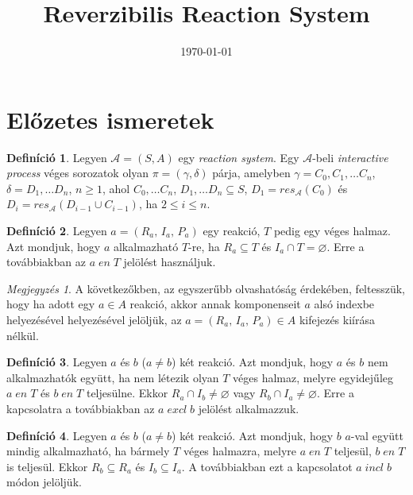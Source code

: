 \documentclass[12pt]{article}
\title{Reverzibilis Reaction System}
\date{\today}
\theoremstyle{definition}
\newtheorem*{definition*}{Definíció}
\theoremstyle{remark}
\newtheorem*{remark*}{Megjegyzés}
\theoremstyle{plain}
\let\emptyset\varnothing
\newcommand{\en}{\; \textit{en} \;}
\newcommand{\excl}{\; \textit{excl} \;}
\newcommand{\incl}{\; \textit{incl} \;}
\newcommand{\reaction}[3]{
    (#1, \, #2, \, #3)
}
\begin{document}
    \maketitle

    \section*{Előzetes ismeretek}

    \begin{definition*}
        Legyen $\mathscr{A} = (S, A)$ egy \textit{reaction system}. Egy $\mathscr{A}$-beli \textit{interactive process} véges sorozatok olyan $\pi = (\gamma, \delta)$ párja, amelyben $\gamma = C_{0}, C_{1}, \ldots C_{n}$, $\delta = D_{1}, \ldots D_{n}$, $n \geq 1$, ahol $C_{0}, \ldots C_{n}$, $D_{1}, \ldots D_{n} \subseteq S$, $D_{1} = \textit{res}_{\mathscr{A}}(C_{0})$ és $D_{i} = \textit{res}_{\mathscr{A}}(D_{i - 1} \cup C_{i - 1})$, ha $2 \leq i \leq n$.
    \end{definition*}

    \begin{definition*}
        Legyen $a = \reaction{R_{a}}{I_{a}}{P_{a}}$ egy reakció, $T$ pedig egy véges halmaz. Azt mondjuk, hogy $a$ alkalmazható $T$-re, ha $R_{a} \subseteq T$ és $I_{a} \cap T = \emptyset$. Erre a továbbiakban az $a \en T$ jelölést használjuk.
    \end{definition*}
    
    \begin{remark*}
        A következőkben, az egyszerűbb olvashatóság érdekében, feltesszük, hogy ha adott egy $a \in A$ reakció, akkor annak komponenseit $a$ alsó indexbe helyezésével helyezésével jelöljük, az $a = \reaction{R_{a}}{I_{a}}{P_{a}} \in A$ kifejezés kiírása nélkül.
    \end{remark*}

    \begin{definition*}
        Legyen $a$ és $b$ ($a \neq b$) két reakció. Azt mondjuk, hogy $a$ és $b$ nem alkalmazhatók együtt, ha nem létezik olyan $T$ véges halmaz, melyre egyidejűleg $a \en T$ és $b \en T$ teljesülne. Ekkor $R_{a} \cap I_{b} \neq \emptyset$ vagy $R_{b} \cap I_{a} \neq \emptyset$. Erre a kapcsolatra a továbbiakban az $a \excl b$ jelölést alkalmazzuk.
    \end{definition*}

    \begin{definition*}
        Legyen $a$ és $b$ ($a \neq b$) két reakció. Azt mondjuk, hogy $b$ $a$-val együtt mindig alkalmazható, ha bármely $T$ véges halmazra, melyre $a \en T$ teljesül, $b \en T$ is teljesül. Ekkor $R_{b} \subseteq R_{a}$ és $I_{b} \subseteq I_{a}$. A továbbiakban ezt a kapcsolatot $a \incl b$ módon jelöljük.
    \end{definition*}
\end{document}
